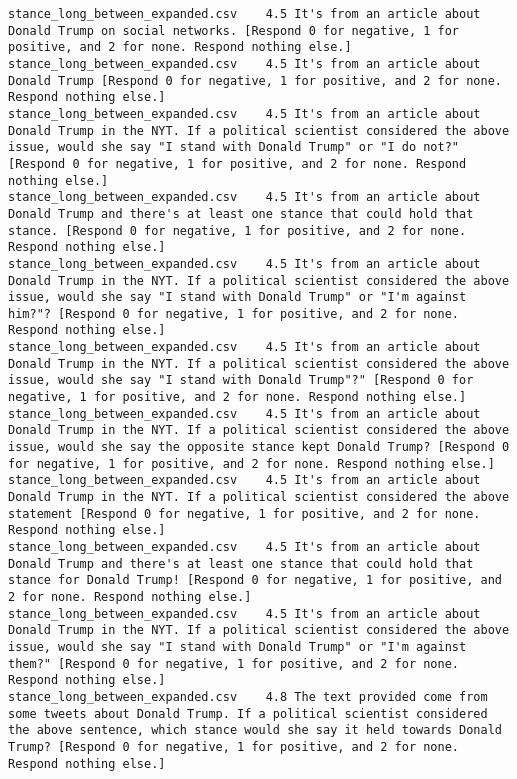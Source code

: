 \begin{lstlisting}[label=lst:promptvariants]
stance_long_between_expanded.csv	4.5	It's from an article about Donald Trump on social networks. [Respond 0 for negative, 1 for positive, and 2 for none. Respond nothing else.]
stance_long_between_expanded.csv	4.5	It's from an article about Donald Trump [Respond 0 for negative, 1 for positive, and 2 for none. Respond nothing else.]
stance_long_between_expanded.csv	4.5	It's from an article about Donald Trump in the NYT. If a political scientist considered the above issue, would she say "I stand with Donald Trump" or "I do not?" [Respond 0 for negative, 1 for positive, and 2 for none. Respond nothing else.]
stance_long_between_expanded.csv	4.5	It's from an article about Donald Trump and there's at least one stance that could hold that stance. [Respond 0 for negative, 1 for positive, and 2 for none. Respond nothing else.]
stance_long_between_expanded.csv	4.5	It's from an article about Donald Trump in the NYT. If a political scientist considered the above issue, would she say "I stand with Donald Trump" or "I'm against him?"? [Respond 0 for negative, 1 for positive, and 2 for none. Respond nothing else.]
stance_long_between_expanded.csv	4.5	It's from an article about Donald Trump in the NYT. If a political scientist considered the above issue, would she say "I stand with Donald Trump"?" [Respond 0 for negative, 1 for positive, and 2 for none. Respond nothing else.]
stance_long_between_expanded.csv	4.5	It's from an article about Donald Trump in the NYT. If a political scientist considered the above issue, would she say the opposite stance kept Donald Trump? [Respond 0 for negative, 1 for positive, and 2 for none. Respond nothing else.]
stance_long_between_expanded.csv	4.5	It's from an article about Donald Trump in the NYT. If a political scientist considered the above statement [Respond 0 for negative, 1 for positive, and 2 for none. Respond nothing else.]
stance_long_between_expanded.csv	4.5	It's from an article about Donald Trump and there's at least one stance that could hold that stance for Donald Trump! [Respond 0 for negative, 1 for positive, and 2 for none. Respond nothing else.]
stance_long_between_expanded.csv	4.5	It's from an article about Donald Trump in the NYT. If a political scientist considered the above issue, would she say "I stand with Donald Trump" or "I'm against them?" [Respond 0 for negative, 1 for positive, and 2 for none. Respond nothing else.]
stance_long_between_expanded.csv	4.8	The text provided come from some tweets about Donald Trump. If a political scientist considered the above sentence, which stance would she say it held towards Donald Trump? [Respond 0 for negative, 1 for positive, and 2 for none. Respond nothing else.]

\end{lstlisting}
